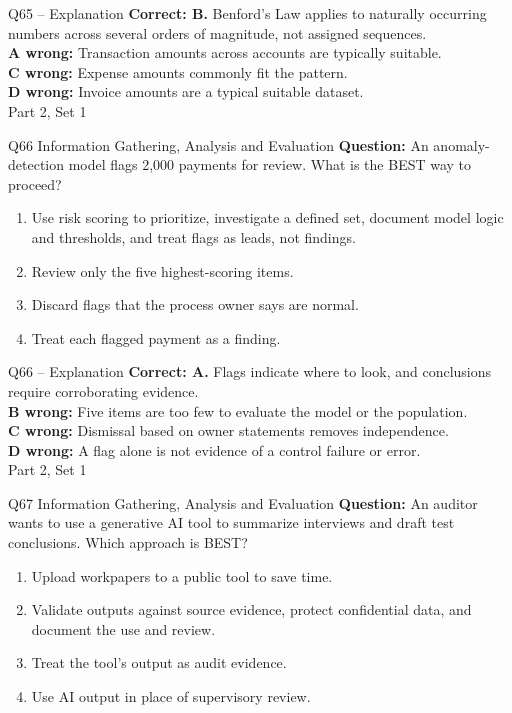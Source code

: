 \documentclass[aspectratio=169,10pt]{beamer}
\begin{document}
\begin{frame}[t]{Q65 -- Explanation}
	\footnotesize
	\textbf{Correct: B.} Benford's Law applies to naturally occurring numbers across several orders of magnitude, not assigned sequences. \\[5pt]
\textbf{A wrong:} Transaction amounts across accounts are typically suitable. \\[3pt]
\textbf{C wrong:} Expense amounts commonly fit the pattern. \\[3pt]
\textbf{D wrong:} Invoice amounts are a typical suitable dataset. \\[3pt]
	\vfill {\tiny Part 2, Set 1}
\end{frame}
\begin{frame}[t]{Q66 \hfill {\scriptsize Information Gathering, Analysis and Evaluation}}
	\small
	\textbf{Question:} An anomaly-detection model flags 2,000 payments for review. What is the BEST way to proceed?
	\begin{enumerate}[label=\Alph*.,itemsep=1pt,topsep=3pt]
			\item Use risk scoring to prioritize, investigate a defined set, document model logic and thresholds, and treat flags as leads, not findings.
			\item Review only the five highest-scoring items.
			\item Discard flags that the process owner says are normal.
			\item Treat each flagged payment as a finding.
	\end{enumerate}
\end{frame}
\begin{frame}[t]{Q66 -- Explanation}
	\footnotesize
	\textbf{Correct: A.} Flags indicate where to look, and conclusions require corroborating evidence. \\[5pt]
\textbf{B wrong:} Five items are too few to evaluate the model or the population. \\[3pt]
\textbf{C wrong:} Dismissal based on owner statements removes independence. \\[3pt]
\textbf{D wrong:} A flag alone is not evidence of a control failure or error. \\[3pt]
	\vfill {\tiny Part 2, Set 1}
\end{frame}
\begin{frame}[t]{Q67 \hfill {\scriptsize Information Gathering, Analysis and Evaluation}}
	\small
	\textbf{Question:} An auditor wants to use a generative AI tool to summarize interviews and draft test conclusions. Which approach is BEST?
	\begin{enumerate}[label=\Alph*.,itemsep=1pt,topsep=3pt]
			\item Upload workpapers to a public tool to save time.
			\item Validate outputs against source evidence, protect confidential data, and document the use and review.
			\item Treat the tool's output as audit evidence.
			\item Use AI output in place of supervisory review.
	\end{enumerate}
\end{frame}
\end{document}
